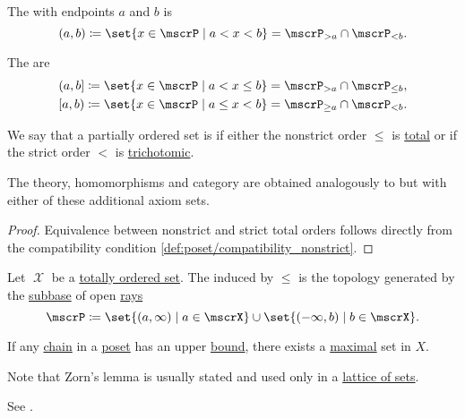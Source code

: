 \begin{definition}
\begin{thmenum}
     The  with endpoints \( a \) and \( b \) is
    \begin{equation*}
      (a, b) \coloneqq \set{ x \in \mscrP \given a < x < b } = \mscrP_{> a} \cap \mscrP_{< b}.
    \end{equation*}

     The  are
    \begin{equation*}
      \begin{aligned}
        (a, b] \coloneqq \set{ x \in \mscrP \given a < x \leq b } = \mscrP_{> a} \cap \mscrP_{\leq b},
        \\
        [a, b) \coloneqq \set{ x \in \mscrP \given a \leq x < b } = \mscrP_{\geq a} \cap \mscrP_{< b}.
      \end{aligned}
    \end{equation*}
  \end{thmenum}
\end{definition}

\begin{definition}\label{def:totally_ordered_set}
  We say that a partially ordered set is  if either the nonstrict order \( \leq \) is \hyperref[def:binary_relation/total]{total} or if the strict order \( < \) is \hyperref[def:binary_relation/trichotomic]{trichotomic}.

  The theory, homomorphisms and category are obtained analogously to  but with either of these additional axiom sets.
\end{definition}
\begin{proof}
  Equivalence between nonstrict and strict total orders follows directly from the compatibility condition \eqref{def:poset/compatibility_nonstrict}.
\end{proof}

\begin{definition}\label{def:order_topology}
  Let \( \mscrX \) be a \hyperref[def:poset]{totally ordered set}. The  induced by \( \leq \) is the topology generated by the \hyperref[def:topological_subbase]{subbase} of open \hyperref[def:poset_interval/ray]{rays}
  \begin{equation*}
    \mscrP \coloneqq \set{ (a, \infty) \given a \in \mscrX } \cup \set{ (-\infty, b) \given b \in \mscrX }.
  \end{equation*}
\end{definition}

\begin{lemma}\label{thm:zorns_lemma}
  If any \hyperref[def:poset_chain_and_antichain]{chain} in a \hyperref[def:poset]{poset} has an upper \hyperref[def:poset_extremal_points/upper_and_lower_bounds]{bound}, there exists a \hyperref[def:poset_extremal_points/maximal_and_minimal_element]{maximal} set in \( X \).

  Note that Zorn's lemma is usually stated and used only in a \hyperref[thm:boolean_algebra_of_subsets]{lattice of sets}.

  See .
\end{lemma}
